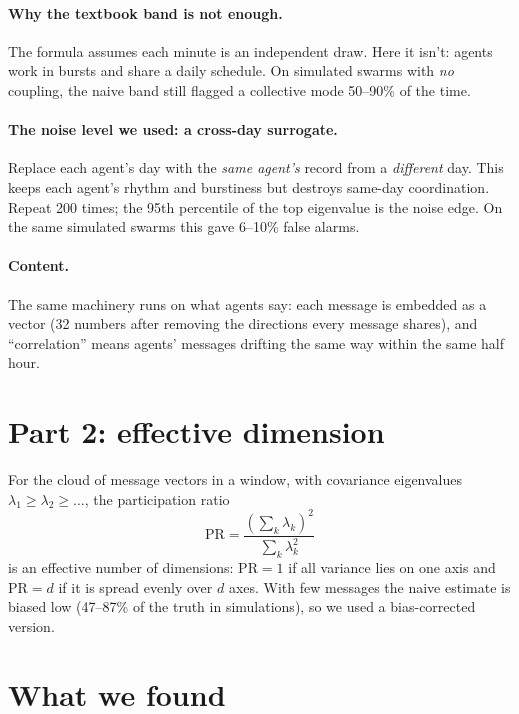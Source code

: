 \documentclass[aps,pre,reprint,10pt,nofootinbib]{revtex4-2}
\begin{document}
\paragraph{Why the textbook band is not enough.} The formula assumes each minute is an independent draw. Here it isn't: agents work in bursts and share a daily schedule. On simulated swarms with \emph{no} coupling, the naive band still flagged a collective mode 50--90\% of the time.

\paragraph{The noise level we used: a cross-day surrogate.} Replace each agent's day with the \emph{same agent's} record from a \emph{different} day. This keeps each agent's rhythm and burstiness but destroys same-day coordination. Repeat 200 times; the 95th percentile of the top eigenvalue is the noise edge. On the same simulated swarms this gave 6--10\% false alarms.

\paragraph{Content.} The same machinery runs on what agents say: each message is embedded as a vector (32 numbers after removing the directions every message shares), and ``correlation'' means agents' messages drifting the same way within the same half hour.

\section{Part 2: effective dimension}
For the cloud of message vectors in a window, with covariance eigenvalues $\lambda_1\ge\lambda_2\ge\dots$, the participation ratio
\begin{equation}
\mathrm{PR}=\frac{\left(\sum_k \lambda_k\right)^2}{\sum_k \lambda_k^2}
\end{equation}
is an effective number of dimensions: $\mathrm{PR}=1$ if all variance lies on one axis and $\mathrm{PR}=d$ if it is spread evenly over $d$ axes. With few messages the naive estimate is biased low (47--87\% of the truth in simulations), so we used a bias-corrected version.

\section{What we found}
\end{document}

